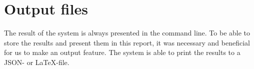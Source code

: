 \section{Output files}
The result of the system is always presented in the command line. To be able to store the results and present them in this report, it was necessary and beneficial for us to make an output feature. The system is able to print the results to a JSON- or LaTeX-file. 


